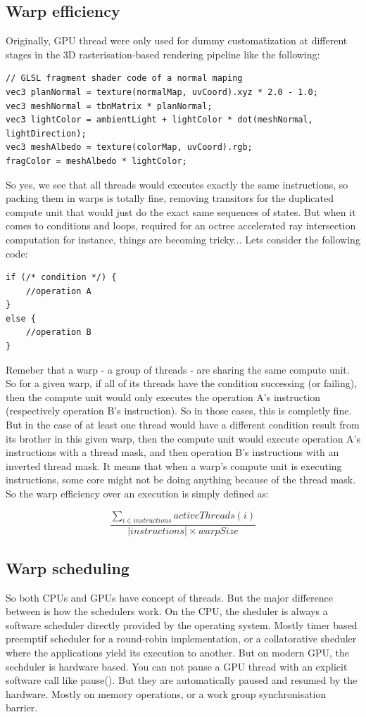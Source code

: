 \documentclass[10pt,twocolumn,a4paper]{article}
\begin{document}
\subsection{Warp efficiency}
Originally, GPU thread were only used for dummy customatization at different
stages in the 3D rasterisation-based rendering pipeline like the following:
\begin{lstlisting}[morekeywords={vec3,texture}]
// GLSL fragment shader code of a normal maping
vec3 planNormal = texture(normalMap, uvCoord).xyz * 2.0 - 1.0;
vec3 meshNormal = tbnMatrix * planNormal;
vec3 lightColor = ambientLight + lightColor * dot(meshNormal, lightDirection);
vec3 meshAlbedo = texture(colorMap, uvCoord).rgb;
fragColor = meshAlbedo * lightColor;
\end{lstlisting}
So yes, we see that all threads would executes exactly the same instructions, so
packing them in warps is totally fine, removing transitors for the duplicated
compute unit that would just do the exact same sequences of states. But when
it comes to conditions and loops, required for an octree accelerated ray
intersection computation for instance, things are becoming tricky... Lets
consider the following code:
\begin{lstlisting}
if (/* condition */) {
    //operation A
}
else {
    //operation B
}
\end{lstlisting}
Remeber that a warp - a group of threads - are sharing the same compute unit. So
for a given warp, if all of its threads have the condition successing (or failing),
then the compute unit would only executes the operation A's instruction (respectively
operation B's instruction). So in those cases, this is completly fine. But in the
case of at least one thread would have a different condition result from its
brother in this given warp, then the compute unit would execute operation A's
instructions with a thread mask, and then operation B's instructions
with an inverted thread mask. It means that when a warp's compute unit is
executing instructions, some core might not be doing anything because of the
thread mask. So the warp efficiency over an execution is simply defined as:

\[\frac{\sum_{i \in instructions}activeThreads(i)}{| instructions | \times warpSize}\]

\subsection{Warp scheduling}
So both CPUs and GPUs have concept of threads. But the major difference between is
how the schedulers work. On the CPU, the sheduler is always a software scheduler
directly provided by the operating system. Mostly timer based preemptif
scheduler for a round-robin implementation, or a collatorative
sheduler where the applications yield its execution to another. But on modern GPU,
the sechduler is hardware based. You can not pause a GPU thread with an explicit
software call like pause().
But they are automatically paused and resumed by the hardware. Mostly on memory
operations, or a work group synchronisation barrier.
\end{document}
